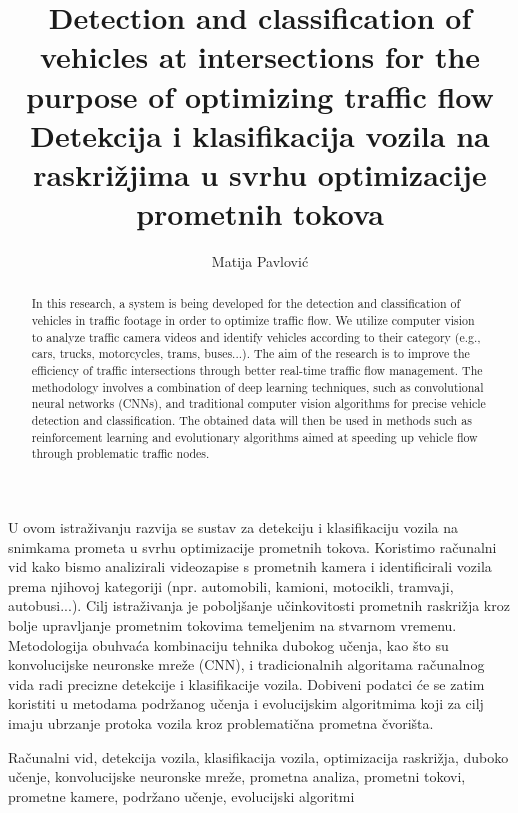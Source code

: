 \documentclass[seminarski, times, utf8]{fer}
\title{Detection and classification of vehicles at intersections for the purpose of optimizing traffic flow }
\title{Detekcija i klasifikacija vozila na raskrižjima u svrhu optimizacije prometnih tokova}
\author{Matija Pavlović}
\date{}
\date{}
\begin{document}
\maketitle



\begin{sazetak}
U ovom istraživanju razvija se sustav za detekciju i klasifikaciju vozila na snimkama prometa u svrhu optimizacije prometnih tokova. Koristimo računalni vid kako bismo analizirali videozapise s prometnih kamera i identificirali vozila prema njihovoj kategoriji (npr. automobili, kamioni, motocikli, tramvaji, autobusi...). Cilj istraživanja je poboljšanje učinkovitosti prometnih raskrižja kroz bolje upravljanje prometnim tokovima temeljenim na stvarnom vremenu. Metodologija obuhvaća kombinaciju tehnika dubokog učenja, kao što su konvolucijske neuronske mreže (CNN), i tradicionalnih algoritama računalnog vida radi precizne detekcije i klasifikacije vozila. Dobiveni podatci će se zatim koristiti u metodama podržanog učenja i evolucijskim algoritmima koji za cilj imaju ubrzanje protoka vozila kroz problematična prometna čvorišta.
\end{sazetak}

\begin{kljucnerijeci}
Računalni vid, detekcija vozila, klasifikacija vozila, optimizacija raskrižja, duboko učenje, konvolucijske neuronske mreže, prometna analiza, prometni tokovi, prometne kamere, podržano učenje, evolucijski algoritmi
\end{kljucnerijeci}

\begin{abstract}
In this research, a system is being developed for the detection and classification of vehicles in traffic footage in order to optimize traffic flow. We utilize computer vision to analyze traffic camera videos and identify vehicles according to their category (e.g., cars, trucks, motorcycles, trams, buses...). The aim of the research is to improve the efficiency of traffic intersections through better real-time traffic flow management. The methodology involves a combination of deep learning techniques, such as convolutional neural networks (CNNs), and traditional computer vision algorithms for precise vehicle detection and classification. The obtained data will then be used in methods such as reinforcement learning and evolutionary algorithms aimed at speeding up vehicle flow through problematic traffic nodes.
\end{abstract}
\end{document}
